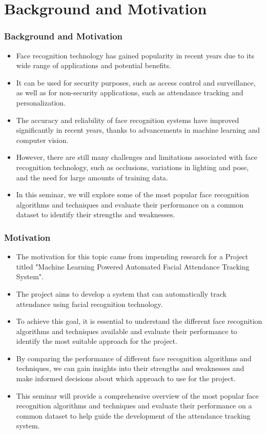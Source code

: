 \documentclass[aspectratio=169]{beamer}
\begin{document}
\section{Background and Motivation}
\begin{frame}
	\centering
	\frametitle{Background and Motivation}
	\begin{minipage}{0.95\textwidth}
		\begin{itemize}
			\item Face recognition technology has gained popularity in recent years due to its wide range of applications and potential benefits.
			\item It can be used for security purposes, such as access control and surveillance, as well as for non-security applications, such as attendance tracking and personalization.
			\item The accuracy and reliability of face recognition systems have improved significantly in recent years, thanks to advancements in machine learning and computer vision.
			\item However, there are still many challenges and limitations associated with face recognition technology, such as occlusions, variations in lighting and pose, and the need for large amounts of training data.
			\item In this seminar, we will explore some of the most popular face recognition algorithms and techniques and evaluate their performance on a common dataset to identify their strengths and weaknesses.
		\end{itemize}
	\end{minipage}
\end{frame}

\begin{frame}
	\centering
	\frametitle{Motivation}
	\begin{minipage}{0.95\textwidth}
		\begin{itemize}
			\item The motivation for this topic came from impending research for a Project titled "Machine Learning Powered Automated Facial Attendance Tracking System".
			\item The project aims to develop a system that can automatically track attendance using facial recognition technology.
			\item To achieve this goal, it is essential to understand the different face recognition algorithms and techniques available and evaluate their performance to identify the most suitable approach for the project.
			\item By comparing the performance of different face recognition algorithms and techniques, we can gain insights into their strengths and weaknesses and make informed decisions about which approach to use for the project.
			\item This seminar will provide a comprehensive overview of the most popular face recognition algorithms and techniques and evaluate their performance on a common dataset to help guide the development of the attendance tracking system.
		\end{itemize}
	\end{minipage}
\end{frame}
\end{document}

